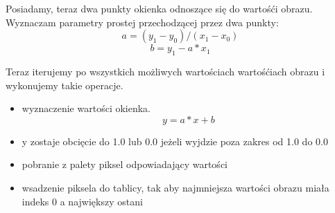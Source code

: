 Posiadamy, teraz dwa punkty okienka odnoszące się do wartośći obrazu.
Wyznaczam parametry prostej przechodzącej przez dwa punkty:
\[a = (y_1 - y_0) / (x_1 - x_0)\]
\[b = y_1 - a * x_1\]

Teraz iterujemy po wszystkich możliwych wartościach wartośćiach obrazu i wykonujemy takie operacje.
\begin{itemize}
    \item wyznaczenie wartości okienka.
    \[y = a * x + b\]
    \item y zostaje obcięcie do 1.0 lub 0.0 jeżeli wyjdzie poza zakres od 1.0 do 0.0
    \item pobranie z palety piksel odpowiadający wartości
    \item wsadzenie piksela do tablicy, tak aby najmniejsza wartości obrazu miała indeks 0 a największy ostani
\end{itemize}